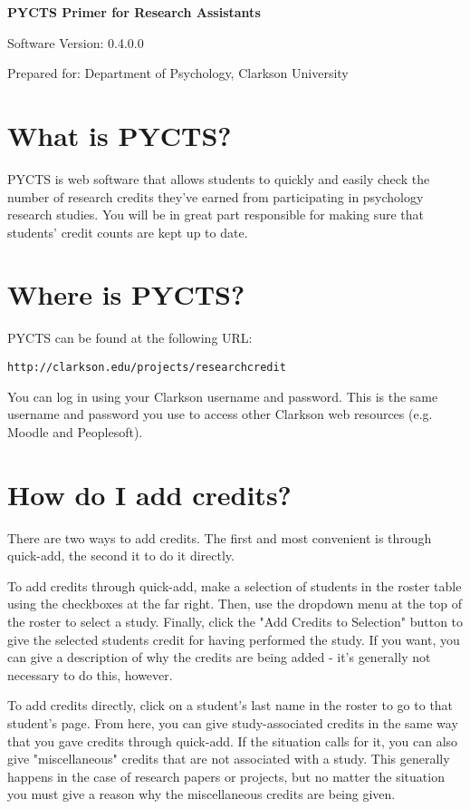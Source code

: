 \documentclass[letterpaper]{article}
\newcommand{\softwareversion}{0.4.0.0}
\begin{document}
\begin{center}
{\bf {\huge PYCTS Primer for Research Assistants } }

Software Version: \softwareversion

Prepared for: Department of Psychology, Clarkson University
\end{center}

\section{What is PYCTS?}
PYCTS is web software that allows students to quickly and easily check the number of research credits they've earned from participating in psychology research studies. You will be in great part responsible for making sure that students' credit counts are kept up to date.

\section{Where is PYCTS?}
PYCTS can be found at the following URL:

{\tt http://clarkson.edu/projects/researchcredit}

You can log in using your Clarkson username and password. This is the same username and password you use to access other Clarkson web resources (e.g. Moodle and Peoplesoft).

\section{How do I add credits?}
There are two ways to add credits. The first and most convenient is through quick-add, the second it to do it directly.

To add credits through quick-add, make a selection of students in the roster table using the checkboxes at the far right. Then, use the dropdown menu at the top of the roster to select a study. Finally, click the "Add Credits to Selection" button to give the selected students credit for having performed the study. If you want, you can give a description of why the credits are being added - it's generally not necessary to do this, however.

To add credits directly, click on a student's last name in the roster to go to that student's page. From here, you can give study-associated credits in the same way that you gave credits through quick-add. If the situation calls for it, you can also give "miscellaneous" credits that are not associated with a study. This generally happens in the case of research papers or projects, but no matter the situation you must give a reason why the miscellaneous credits are being given.
\end{document}

